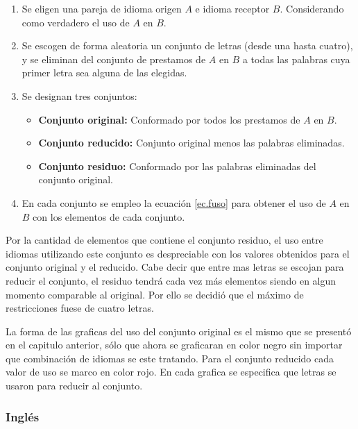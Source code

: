 \begin{enumerate}
	
	\item Se eligen una pareja de idioma origen $\textit{A}$ e idioma receptor $\textit{B}$. Considerando como verdadero el uso de $\textit{A}$  en $\textit{B}$. 
	
	\item Se escogen de forma aleatoria un conjunto de letras (desde una hasta cuatro), y se eliminan del conjunto de prestamos de $\textit{A}$  en $\textit{B}$ a todas las palabras cuya primer letra sea alguna de las elegidas.  
	
	\item Se designan tres conjuntos:
	
		\begin{itemize}
			\item \textbf{Conjunto original:} Conformado por todos los prestamos de $\textit{A}$  en $\textit{B}$.
			\item \textbf{Conjunto reducido:} Conjunto original menos las palabras eliminadas. 
			\item \textbf{Conjunto residuo:} Conformado por las palabras eliminadas del conjunto original. 
		\end{itemize}
	
	\item En cada conjunto se empleo la ecuación \ref{ec.fuso} para obtener el uso de $\textit{A}$ en $\textit{B}$  con los elementos de cada conjunto. 
	
\end{enumerate}


Por la cantidad de elementos que contiene el conjunto residuo, el uso entre idiomas utilizando este conjunto es despreciable con los valores obtenidos para el conjunto original y el reducido.  Cabe decir que entre mas letras se escojan para reducir el conjunto, el residuo tendrá cada vez más elementos siendo en algun momento comparable al original.  Por ello se decidió que el máximo de restricciones fuese de cuatro letras. 

La forma de las graficas del uso del conjunto original es el mismo que se presentó en el capitulo anterior, sólo que ahora se graficaran en color negro sin importar que combinación de idiomas se este tratando.  Para el conjunto reducido cada valor de uso se marco en color rojo.  En cada grafica se especifica que letras se usaron para reducir al conjunto.


\subsubsection*{Inglés}

